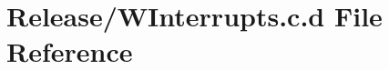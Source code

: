 \hypertarget{_release_2_w_interrupts_8c_8d}{\section{\-Release/\-W\-Interrupts.c.\-d \-File \-Reference}
\label{_release_2_w_interrupts_8c_8d}
}
